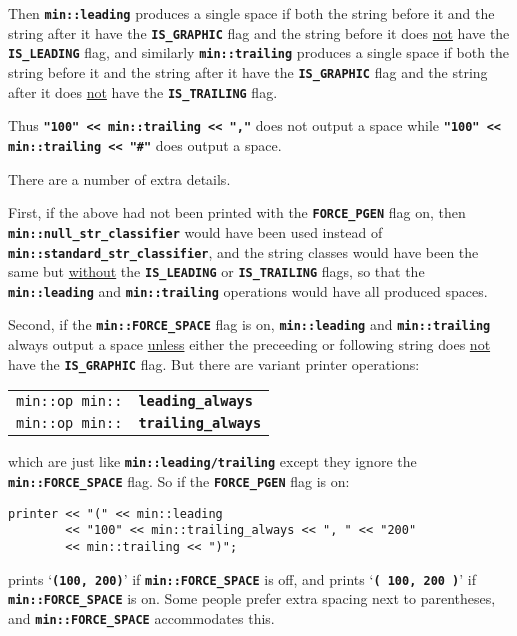\documentclass[12pt]{article}
\makeatletter
\newcommand{\TT}[1]{{\tt \bfseries #1}}
\newcommand{\ttindex}[1]{\index{#1@{\tt #1}}}
\newcommand{\EOL}{\penalty \exhyphenpenalty}
\newenvironment{indpar}[1][0.3in]%
	{\begin{list}{}%
		     {\setlength{\itemsep}{0in}%
		      \setlength{\topsep}{0in}%
		      \setlength{\parsep}{1ex}%
		      \setlength{\labelwidth}{#1}%
		      \setlength{\leftmargin}{#1}%
		      \addtolength{\leftmargin}{\labelsep}}%
	 \item}%
	{\end{list}}
\newcommand{\LABEL}[1]{\label{#1}}
\newcommand{\MINKEY}[1]%
	   {\TT{#1}\ttindex{min::#1}\ttindex{#1}}
\makeatother
\begin{document}
Then \TT{min::leading} produces a single
space if both the string before it and the string after it have
the \TT{IS\_\EOL GRAPHIC} flag and the string before it does
\underline{not} have the \TT{IS\_\EOL LEADING} flag, and
similarly \TT{min::trailing} produces a single
space if both the string before it and the string after it have
the \TT{IS\_\EOL GRAPHIC} flag and the string after it does
\underline{not} have the \TT{IS\_\EOL TRAILING} flag.

Thus \TT{"100" <{}< min::trailing <{}< ","} does not output a space
while \TT{"100" <{}< min::\EOL trail\-ing <{}< "\#"} does output a space.

There are a number of extra details.

First, if the above had not been printed with the \TT{FORCE\_\EOL PGEN}
flag on, then \TT{min::\EOL null\_\EOL str\_\EOL classifier} would have
been used instead of \TT{min::\EOL standard\_\EOL str\_\EOL classifier},
and the string classes would have been the same but \underline{without}
the \TT{IS\_\EOL LEADING} or \TT{IS\_\EOL TRAILING} flags, so that the
\TT{min::\EOL leading} and \TT{min::\EOL trailing} operations would have all
produced spaces.

Second, if the \TT{min::FORCE\_SPACE} flag is on, \TT{min::leading}
and \TT{min::trailing} always output a space \underline{unless}
either the preceeding or following string does \underline{not} have
the \TT{IS\_\EOL GRAPHIC} flag.  But there are variant printer
operations:

\begin{indpar}[1em]\begin{tabular}{r@{}l}
\verb|min::op min::| & \MINKEY{leading\_always}
\LABEL{MIN::LEADING_ALWAYS} \\
\verb|min::op min::| & \MINKEY{trailing\_always}
\LABEL{MIN::TRAILING_ALWAYS} \\
\end{tabular}\end{indpar}

which are just like \TT{min::leading/trailing} except they
ignore the \TT{min::\EOL FORCE\_\EOL SPACE} flag.  So if
the \TT{FORCE\_\EOL PGEN} flag is on:

\begin{indpar}\begin{verbatim}
printer << "(" << min::leading
        << "100" << min::trailing_always << ", " << "200"
        << min::trailing << ")";
\end{verbatim}\end{indpar}
prints `\TT{(100, 200)}' if \TT{min::\EOL FORCE\_\EOL SPACE} is off, and
prints `\TT{( 100, 200 )}' if \TT{min::\EOL FORCE\_\EOL SPACE} is on.
Some people prefer extra spacing next to parentheses, and
\TT{min::\EOL FORCE\_\EOL SPACE} accommodates this.
\end{document}
